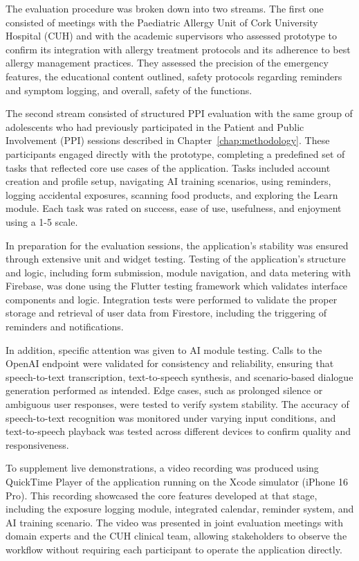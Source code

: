 \documentclass[MScCS]{uccthesis}
\begin{document}
The evaluation procedure was broken down into two streams. The first one consisted of meetings with the Paediatric Allergy Unit of Cork University Hospital (CUH) and with the academic supervisors who assessed prototype to confirm its integration with allergy treatment protocols and its adherence to best allergy management practices. They assessed the precision of the emergency features, the educational content outlined, safety protocols regarding reminders and symptom logging, and overall, safety of the functions.

The second stream consisted of structured PPI evaluation with the same group of adolescents who had previously participated in the Patient and Public Involvement (PPI) sessions described in Chapter~\ref{chap:methodology}. These participants engaged directly with the prototype, completing a predefined set of tasks that reflected core use cases of the application. Tasks included account creation and profile setup, navigating AI training scenarios, using reminders, logging accidental exposures, scanning food products, and exploring the Learn module. Each task was rated on success, ease of use, usefulness, and enjoyment using a 1-5 scale.  

In preparation for the evaluation sessions, the application's stability was ensured through extensive unit and widget testing. Testing of the application's structure and logic, including form submission, module navigation, and data metering with Firebase, was done using the Flutter testing framework which validates interface components and logic. Integration tests were performed to validate the proper storage and retrieval of user data from Firestore, including the triggering of reminders and notifications.

In addition, specific attention was given to AI module testing. Calls to the OpenAI endpoint were validated for consistency and reliability, ensuring that speech-to-text transcription, text-to-speech synthesis, and scenario-based dialogue generation performed as intended. Edge cases, such as prolonged silence or ambiguous user responses, were tested to verify system stability. The accuracy of speech-to-text recognition was monitored under varying input conditions, and text-to-speech playback was tested across different devices to confirm quality and responsiveness.  

To supplement live demonstrations, a video recording was produced using QuickTime Player of the application running on the Xcode simulator (iPhone 16 Pro). This recording showcased the core features developed at that stage, including the exposure logging module, integrated calendar, reminder system, and AI training scenario. The video was presented in joint evaluation meetings with domain experts and the CUH clinical team, allowing stakeholders to observe the workflow without requiring each participant to operate the application directly.  
\end{document}
